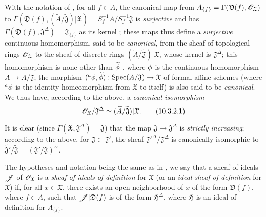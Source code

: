 \begin{env}[10.3.2]
\label{1.10.3.2}
With the notation of , for all $f\in A$, the canonical map from $A_{\{f\}}=\Gamma(\mathfrak{D}(f),\mathscr{O}_\mathfrak{X})$ to $\Gamma(\mathfrak{D}(f),(\widetilde{A}/\widetilde{\mathfrak{J}})|\mathfrak{X})=S_f^{-1}A/S_f^{-1}\mathfrak{J}$ is \emph{surjective} and has $\Gamma(\mathfrak{D}(f),\mathfrak{J}^\Delta)=\mathfrak{J}_{\{f\}}$ as its kernel ; these maps thus define a \emph{surjective} continuous homomorphism, said to be \emph{canonical}, from the sheaf of topological rings $\mathscr{O}_\mathfrak{X}$ to the sheaf of discrete rings $(\widetilde{A}/\widetilde{\mathfrak{J}})|\mathfrak{X}$, whose kernel is $\mathfrak{J}^\Delta$; this homomorphism is none other than $\widetilde{\phi}$ , where $\phi$ is the continuous homomorphism $A\to A/\mathfrak{J}$; the morphism $({}^a\vphi,\widetilde{\vphi}):\Spec(A/\mathfrak{J})\to\mathfrak{X}$ of formal affine schemes (where ${}^a\phi$ is the identity homeomorphism from $\mathfrak{X}$ to itself) is also said to be \emph{canonical}.
We thus have, according to the above, a \emph{canonical isomorphism}
\begin{equation*}
\label{1.10.3.2.1}
  \mathscr{O}_\mathfrak{X}/\mathfrak{J}^\Delta\simeq(\widetilde{A}/\widetilde{\mathfrak{J}})|\mathfrak{X}.
  \tag{10.3.2.1}
\end{equation*}

It is clear (since $\Gamma(\mathfrak{X},\mathfrak{J}^\Delta)=\mathfrak{J}$) that the map $\mathfrak{J}\to\mathfrak{J}^\Delta$ is \emph{strictly increasing}; according to the above, for $\mathfrak{J}\subset\mathfrak{J}'$, the sheaf ${\mathfrak{J}'}^\Delta/\mathfrak{J}^\Delta$ is canonically isomorphic to $\widetilde{\mathfrak{J}'}/\widetilde{\mathfrak{J}}=(\mathfrak{J}'/\mathfrak{J})^\sim$.
\end{env}

\begin{env}[10.3.3]
\label{1.10.3.3}
The hypotheses and notation being the same as in , we say that a sheaf of ideals $\mathscr{J}$ of $\mathscr{O}_\mathfrak{X}$ is a \emph{sheaf of ideals of definition} for $\mathfrak{X}$ (or an \emph{ideal sheaf of definition} for $\mathfrak{X}$) if, for all $x\in\mathfrak{X}$, there exists an open neighborhood of $x$ of the form $\mathfrak{D}(f)$, where $f\in A$, such that $\mathscr{J}|\mathfrak{D}(f)$ is of the form $\mathfrak{H}^\Delta$, where $\mathfrak{H}$ is an ideal of definition for $A_{\{f\}}$.
\end{env}

